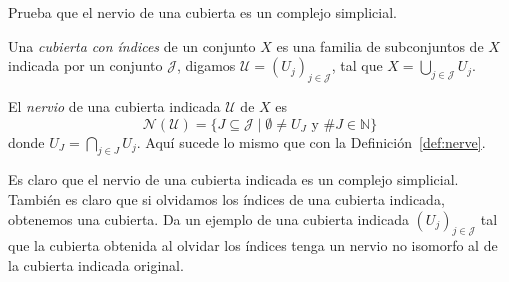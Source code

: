 \documentclass{standalone}
\begin{document}
	\begin{exercise}
		Prueba que el nervio de una cubierta es un complejo simplicial.
	\end{exercise}
	
	\begin{definition}\label{def:index_cover}
		Una \emph{cubierta con índices} de un conjunto $X$ es una familia de subconjuntos de $X$ indicada por un conjunto $\mathcal{J}$, digamos $\mathcal{U}=(U_{j})_{j\in \mathcal{J}}$, tal que $X=\bigcup_{j\in \mathcal{J}}U_{j}$.
	\end{definition}
	
	\begin{definition}\label{def:indexed_nerve}
		El \emph{nervio} de una cubierta indicada $\mathcal{U}$ de $X$ es 
		\[
		\mathcal{N}(\mathcal{U})=\{J\subseteq \mathcal{J}\mid \emptyset\neq U_{J}\text{ y }\#J\in\mathbb{N}\}
		\]donde $U_{J}=\bigcap_{j\in J}U_{j}$. Aquí sucede lo mismo que con la Definición~\ref{def:nerve}.
	\end{definition}
	
	\begin{exercise}\label{ex:different_nerves_same_cover}
		Es claro que el nervio de una cubierta indicada es un complejo simplicial. También es claro que si olvidamos los índices de una cubierta indicada, obtenemos una cubierta. Da un ejemplo de una cubierta indicada $(U_{j})_{j\in \mathcal{J}}$ tal que la cubierta obtenida al olvidar los índices tenga un nervio no isomorfo al de la cubierta indicada original.
	\end{exercise}
\end{document}
